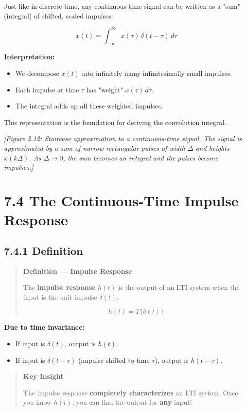 \documentclass[11pt]{article}
\begin{document}
Just like in discrete-time, any continuous-time signal can be written as a "sum" (integral) of shifted, scaled impulses:

\[\boxed{\;x(t) = \int_{-\infty}^{\infty} x(\tau)\,\delta(t - \tau)\,d\tau\;}\]

\textbf{Interpretation:}

\begin{itemize}
  \item We decompose $x(t)$ into infinitely many infinitesimally small impulses.
  \item Each impulse at time $\tau$ has "weight" $x(\tau)\,d\tau$.
  \item The integral adds up all these weighted impulses.
\end{itemize}

This representation is the foundation for deriving the convolution integral.

\textit{[Figure 2.12: Staircase approximation to a continuous-time signal. The signal is approximated by a sum of narrow rectangular pulses of width $\Delta$ and heights $x(k\Delta)$. As $\Delta \to 0$, the sum becomes an integral and the pulses become impulses.]}

\section*{7.4 The Continuous-Time Impulse Response}

\subsection*{7.4.1 Definition}

\begin{quote}
\textbf{Definition — Impulse Response}

The \textbf{impulse response} $h(t)$ is the output of an LTI system when the input is the unit impulse $\delta(t)$:

\[h(t) = T\{\delta(t)\}\]
\end{quote}

\textbf{Due to time invariance:}

\begin{itemize}
  \item If input is $\delta(t)$, output is $h(t)$.
  \item If input is $\delta(t - \tau)$ (impulse shifted to time $\tau$), output is $h(t - \tau)$.
\end{itemize}

\begin{quote}
\textbf{Key Insight}

The impulse response \textbf{completely characterizes} an LTI system. Once you know $h(t)$, you can find the output for \textbf{any} input!
\end{quote}
\end{document}
